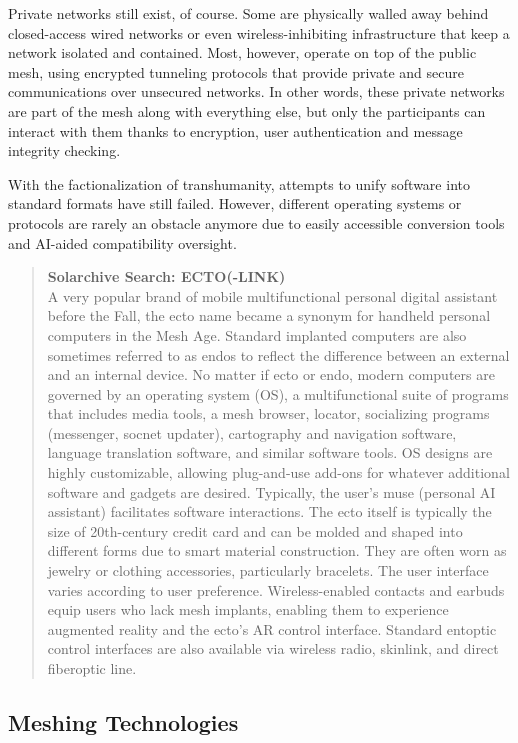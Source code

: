 Private networks still exist, of course. Some are 
physically walled away behind closed-access wired networks
or even wireless-inhibiting infrastructure that
keep a network isolated and contained. Most, however, 
operate on top of the public mesh, using encrypted 
tunneling protocols that provide private and secure 
communications over unsecured networks. In other 
words, these private networks are part of the mesh 
along with everything else, but only the participants 
can interact with them thanks to encryption, user authentication
and message integrity checking.

With the factionalization of transhumanity, attempts
to unify software into standard formats have
still failed. However, different operating systems 
or protocols are rarely an obstacle anymore due to 
easily accessible conversion tools and AI-aided compatibility
oversight.

\begin{quotation}
\textbf{Solarchive Search: ECTO(-LINK)}
\\
A very popular brand of mobile multifunctional
personal digital assistant
before the Fall, the ecto name became
a synonym for handheld personal
computers in the Mesh Age. Standard
implanted computers are also sometimes
referred to as endos to reflect
the difference between an external
and an internal device.
No matter if ecto or endo, modern
computers are governed by an operating
system (OS), a multifunctional
suite of programs that includes media
tools, a mesh browser, locator, socializing
programs (messenger, socnet
updater), cartography and navigation
software, language translation
software, and similar software tools.
OS designs are highly customizable,
allowing plug-and-use add-ons for
whatever additional software and
gadgets are desired. Typically, the
user’s muse (personal AI assistant)
facilitates software interactions.
The ecto itself is typically the size
of 20th-century credit card and can
be molded and shaped into different
forms due to smart material construction.
They are often worn as jewelry or
clothing accessories, particularly bracelets.
The user interface varies according
to user preference. Wireless-enabled
contacts and earbuds equip users who
lack mesh implants, enabling them to
experience augmented reality and the
ecto’s AR control interface. Standard
entoptic control interfaces are also
available via wireless radio, skinlink,
and direct fiberoptic line.
\end{quotation}


\subsection{Meshing Technologies}

